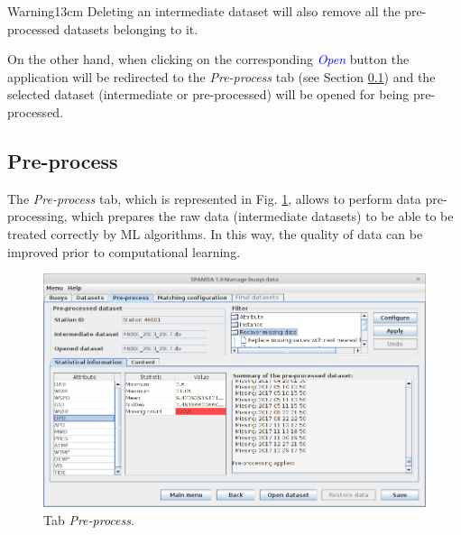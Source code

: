 \begin{onehalfspace}
				\begin{center}
					\begin{warningbox}{Warning}{13cm}
						Deleting an intermediate dataset will also remove all the pre-processed datasets belonging to it.
					\end{warningbox}
				\end{center}
				
				On the other hand, when clicking on the corresponding \textcolor{blue}{\textit{Open}} button the application will be redirected to the \textit{Pre-process} tab (see Section \ref{sec:Preprocess}) and the selected dataset (intermediate or pre-processed) will be opened for being pre-processed.
			
			\subsection{Pre-process}\label{sec:Preprocess}
			
				
				The \textit{Pre-process} tab, which is represented in Fig. \ref{fig:tabPreprocess}, allows to perform data pre-processing, which prepares the raw data (intermediate datasets) to be able to be treated correctly by ML algorithms. In this way, the quality of data can be improved prior to computational learning.
				
				\begin{figure}[ht!]
					\centering
					\includegraphics[scale=0.40]{figures/tabPreprocess.png}
					\caption{Tab \textit{Pre-process}.}
					\label{fig:tabPreprocess}
				\end{figure}
			

\end{onehalfspace}
